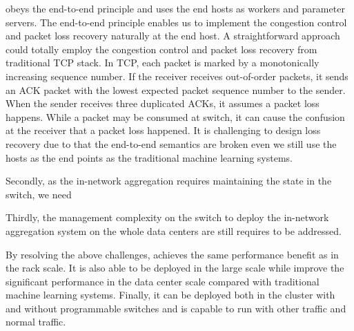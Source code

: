 \system obeys the end-to-end principle and uses the end hosts as workers and parameter servers. 
The end-to-end principle enables us to implement the congestion control and packet loss recovery 
naturally at the end host. A straightforward approach could totally employ 
the congestion control and packet loss recovery from traditional TCP stack.
In TCP, each packet is marked by a monotonically increasing sequence number. 
If the receiver receives out-of-order packets, it sends an ACK packet with the lowest 
expected packet sequence number to the sender. 
When the sender receives three duplicated ACKs, it assumes a packet loss happens.
While a packet may be consumed at switch, it can cause the confusion at the receiver
that a packet loss happened. It is challenging to design loss recovery due to that the end-to-end semantics are broken even we still use the hosts as the end points as the traditional machine learning systems. 
 
Secondly, as the in-network aggregation requires maintaining the state in the switch, 
we need 

Thirdly, the management complexity on the switch to deploy 
the in-network aggregation system on the whole data centers 
are still requires to be addressed.



By resolving the above challenges, \system achieves the same performance benefit 
as \switchml in the rack scale. 
It is also able to be deployed in the large scale while improve the significant 
performance in the data center scale compared with traditional machine learning systems. 
Finally, it can be deployed both in the cluster with and without 
programmable switches and is capable to run with other \system traffic and normal traffic. 
